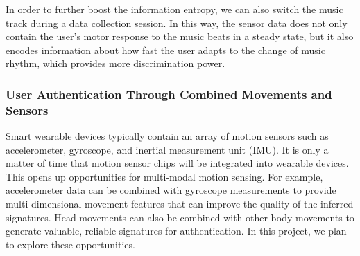 In order to further boost the information entropy, we can also switch the music track during a data collection session. In this way, the sensor data does not only contain the user's motor response to the music beats in a steady state, but it also encodes information about how fast the user adapts to the change of music rhythm, which provides more discrimination power.

\subsubsection{User Authentication Through Combined Movements and Sensors}

Smart wearable devices typically contain an array of motion sensors such as accelerometer, gyroscope, and inertial measurement unit (IMU). It is only a matter of time that motion sensor chips will be integrated into wearable devices.
This opens up opportunities for multi-modal motion sensing. For example,
accelerometer data can be combined with gyroscope measurements to provide
multi-dimensional movement features that can improve the quality of the
inferred signatures. Head movements can also be combined with other body movements to generate
valuable, reliable signatures for authentication. In this project, we plan to explore these opportunities.


